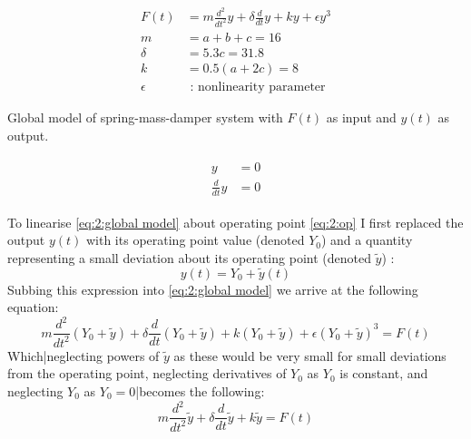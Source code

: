 \problem

\begin{captioneq}[h]
	\centering
	\begin{align}\label{eq:2:global model}
		F(t)&=m\frac{d^2}{dt^2}y+\delta \frac{d}{dt}y + ky + \epsilon y ^3\\
		m &= a+b+c = 16\nonumber\\
		\delta &= 5.3 c = 31.8\nonumber\\
		k &= 0.5(a+2c)= 8\nonumber\\
		\epsilon &\text{ : nonlinearity parameter}\nonumber 
	\end{align}
	\caption{Global model of spring-mass-damper system with $F(t)$ as input and $y(t)$ as output.}
	
\end{captioneq}


\begin{align}
	\label{eq:2:op}
	\begin{split}
			y&=0\\
			\frac{d}{dt}y&=0
	\end{split}
\end{align}

To linearise \cref{eq:2:global model} about operating point \cref{eq:2:op} I first replaced the output $y(t)$ with its operating point value (denoted $Y_0$) and a quantity representing a small deviation about its operating point (denoted $\tilde{y}$) :
$$
y(t) = Y_0 + \tilde{y}(t)
$$
Subbing this expression into \cref{eq:2:global model} we arrive at the following equation:
$$
m\frac{d^2}{dt^2}(Y_0 + \tilde{y})+\delta \frac{d}{dt}(Y_0 + \tilde{y}) + k(Y_0 + \tilde{y}) + \epsilon (Y_0 + \tilde{y})^3 = F(t)
$$
Which|neglecting powers of $\tilde{y}$ as these would be very small for small deviations from the operating point, neglecting derivatives of $Y_0$ as $Y_0$ is constant, and neglecting $Y_0$ as $Y_0=0$|becomes the following:
\begin{equation}\label{eq:2:global deviations}
	m\frac{d^2}{dt^2} \tilde{y}+\delta \frac{d}{dt}\tilde{y} + k\tilde{y}= F(t)
\end{equation}

